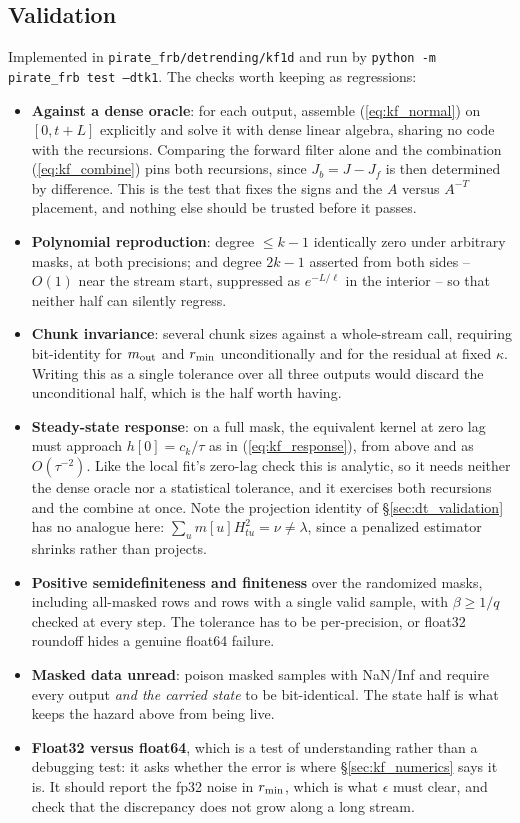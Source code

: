 \documentclass{article}
\numberwithin{equation}{section}   %
\begin{document}
\subsection{Validation}
\label{sec:kf_validation}

Implemented in {\tt pirate\_frb/detrending/kf1d} and run by {\tt python -m pirate\_frb test --dtk1}.
The checks worth keeping as regressions:
\begin{itemize}
\item {\bf Against a dense oracle}: for each output, assemble (\ref{eq:kf_normal}) on $[0,t+L]$ explicitly and
solve it with dense linear algebra, sharing no code with the recursions.  Comparing the forward filter alone
and the combination (\ref{eq:kf_combine}) pins both recursions, since $J_b = J - J_f$ is then determined by
difference.  This is the test that fixes the signs and the $A$ versus $A^{-T}$ placement, and nothing else
should be trusted before it passes.
\item {\bf Polynomial reproduction}: degree $\le k-1$ identically zero under arbitrary masks, at both
precisions; and degree $2k-1$ asserted from both sides -- $O(1)$ near the stream start, suppressed as
$e^{-L/\ell}$ in the interior -- so that neither half can silently regress.
\item {\bf Chunk invariance}: several chunk sizes against a whole-stream call, requiring bit-identity for
$m_{\rm out}$ and $r_{\rm min}$ unconditionally and for the residual at fixed $\kappa$.  Writing this as a
single tolerance over all three outputs would discard the unconditional half, which is the half worth having.
\item {\bf Steady-state response}: on a full mask, the equivalent kernel at zero lag must approach
$h[0] = c_k/\tau$ as in (\ref{eq:kf_response}), from above and as $O(\tau^{-2})$.  Like the local fit's
zero-lag check this is analytic, so it needs neither the dense oracle nor a statistical tolerance, and it
exercises both recursions and the combine at once.  Note the projection identity of
\S\ref{sec:dt_validation} has no analogue here: $\sum_u m[u]H_{tu}^2 = \nu \ne \lambda$, since a penalized
estimator shrinks rather than projects.
\item {\bf Positive semidefiniteness and finiteness} over the randomized masks, including all-masked rows and
rows with a single valid sample, with $\beta \ge 1/q$ checked at every step.  The tolerance has to be
per-precision, or float32 roundoff hides a genuine float64 failure.
\item {\bf Masked data unread}: poison masked samples with NaN/Inf and require every output {\em and the
carried state} to be bit-identical.  The state half is what keeps the hazard above from being live.
\item {\bf Float32 versus float64}, which is a test of understanding rather than a debugging test: it asks
whether the error is where \S\ref{sec:kf_numerics} says it is.  It should report the fp32 noise in
$r_{\rm min}$, which is what $\epsilon$ must clear, and check that the discrepancy does not grow along a long
stream.
\end{itemize}
\end{document}

